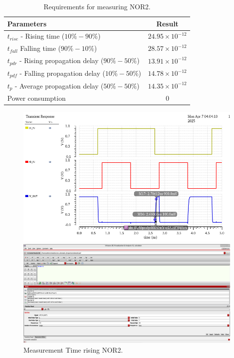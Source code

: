\begin{table}[H]
	\centering
	\begin{tabular}{|p{.5\linewidth}|c|}
		\hline
		Parameters & Result\\
		\hline
		$t_{rise}$ - Rising time ($10\% - 90\%$) & $24.95\times10^{-12}$\\
		\hline
		$t_{fall}$  Falling time ($90\% - 10\%$) & $28.57\times10^{-12}$\\
		\hline
		$t_{pdr}$ - Rising propagation delay ($90\% - 50\%$) & $13.91\times10^{-12}$\\
		\hline
		$t_{pdf}$ - Falling propagation delay ($10\% - 50\%$) & $14.78\times10^{-12}$\\
		\hline
		$t_{p}$ - Average propagation delay ($50\% - 50\%$) & $14.35\times10^{-12}$\\
		\hline
		Power consumption & $0$\\
		\hline
	\end{tabular}
	\caption{Requirements for measuring NOR2.}
	\label{f_measuring NOR2}
\end{table}

\begin{figure}[H]
	\begin{minipage}{0.5\linewidth}
		\includegraphics[width=\linewidth]{section/EX1/NOR/EX1_NOR2_Tr_Waveform.png}
	\end{minipage}
	\begin{minipage}{0.5\linewidth}
		\includegraphics[width=\linewidth]{section/EX1/NOR/EX1_NOR2_Tr_Cal.png}
	\end{minipage}
	\caption{Measurement Time rising NOR2.}
\end{figure}

